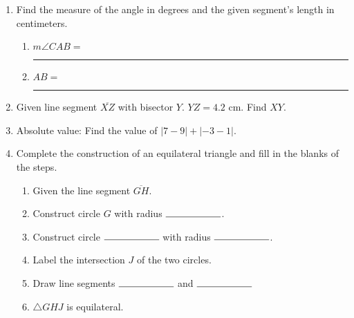 \documentclass[12pt, oneside]{article}
\begin{document}
\begin{enumerate}
\item Find the measure of the angle in degrees and the given segment's length in centimeters. \vspace{0.25cm}
  \begin{enumerate}
    \item  $m \angle CAB = $ \rule{4cm}{0.15mm} \bigskip
    \item  $AB=$ \rule{4cm}{0.15mm} \bigskip
  \end{enumerate}
  \begin{center}
  \end{center}

\newpage
\item Given line segment $\overline{XZ}$ with bisector $Y$. $YZ=4.2$ cm. Find $XY$.\\[1.5cm]
  \vspace{1cm}

\item Absolute value: Find the value of $|7-9|+|-3-1|$. \vspace{1cm}

\item Complete the construction of an equilateral triangle and fill in the blanks of the steps.
  \begin{enumerate}
    \item Given the line segment $\overline{GH}$. \bigskip
    \item Construct circle $G$ with radius $\rule{2cm}{0.15mm}$. \bigskip
    \item Construct circle $\rule{2cm}{0.15mm}$  with radius $\rule{2cm}{0.15mm}$. \bigskip
    \item Label the intersection $J$ of the two circles. \bigskip
    \item Draw line segments $\rule{2cm}{0.15mm}$  and $\rule{2cm}{0.15mm}$
    \item $\triangle GHJ$ is equilateral.
  \end{enumerate}
  \vspace{5cm}
  \begin{center}
  \end{center}


\end{enumerate}
\end{document}
